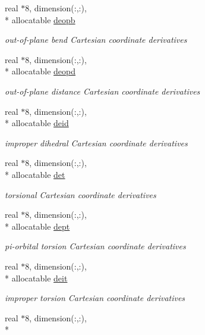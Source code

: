 \begin{DoxyCompactItemize}
real $\ast$8, dimension(\-:,\-:), \\*
allocatable \hyperlink{classderiv_a9c79f676fc042450c0d757ca7fcc90d4}{deopb}
\begin{DoxyCompactList}\small\item\em out-\/of-\/plane bend Cartesian coordinate derivatives \end{DoxyCompactList}\item 
real $\ast$8, dimension(\-:,\-:), \\*
allocatable \hyperlink{classderiv_aa8eae10f8664832413974a490f939ebb}{deopd}
\begin{DoxyCompactList}\small\item\em out-\/of-\/plane distance Cartesian coordinate derivatives \end{DoxyCompactList}\item 
real $\ast$8, dimension(\-:,\-:), \\*
allocatable \hyperlink{classderiv_ab0687390c082d71e1256dee35ba0e02d}{deid}
\begin{DoxyCompactList}\small\item\em improper dihedral Cartesian coordinate derivatives \end{DoxyCompactList}\item 
real $\ast$8, dimension(\-:,\-:), \\*
allocatable \hyperlink{classderiv_a6080bc7632418716603f5fe338fffd26}{det}
\begin{DoxyCompactList}\small\item\em torsional Cartesian coordinate derivatives \end{DoxyCompactList}\item 
real $\ast$8, dimension(\-:,\-:), \\*
allocatable \hyperlink{classderiv_ac3d9dddf5a57575b5fa0a8668554cc0b}{dept}
\begin{DoxyCompactList}\small\item\em pi-\/orbital torsion Cartesian coordinate derivatives \end{DoxyCompactList}\item 
real $\ast$8, dimension(\-:,\-:), \\*
allocatable \hyperlink{classderiv_a8fe01550c44dc68a07ef1be166c5f10e}{deit}
\begin{DoxyCompactList}\small\item\em improper torsion Cartesian coordinate derivatives \end{DoxyCompactList}\item 
real $\ast$8, dimension(\-:,\-:), \\*

\end{DoxyCompactItemize}
